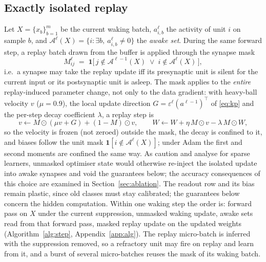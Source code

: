 \documentclass{article}
\begin{document}
\subsection{Exactly isolated replay}
\label{sec:isolation}

Let $X=\{x_b\}_{b=1}^{m}$ be the current waking batch, $a^\ell_{i,b}$ the activity of unit
$i$ on sample $b$, and $\mathcal{A}^\ell(X) = \{i : \exists b,\ a^\ell_{i,b} \neq 0\}$ the
\emph{awake set}. During the same forward step, a replay batch drawn from the buffer is
applied through the synapse mask
\begin{equation}
M^\ell_{ij} \;=\; \mathbf{1}\big[\, j \notin \mathcal{A}^{\ell-1}(X) \;\lor\; i \notin \mathcal{A}^{\ell}(X) \,\big],
\label{eq:mask}
\end{equation}
i.e.\ a synapse may take the replay update iff its presynaptic unit is silent for the current
input or its postsynaptic unit is asleep. The mask applies to the \emph{entire} replay-induced
parameter change, not only to the data gradient: with heavy-ball velocity $v$ ($\mu=0.9$),
the local update direction $G=\varepsilon^\ell(a^{\ell-1})^{\!\top}$ of \eqref{eq:kp} and the
per-step decay coefficient $\lambda$, a replay step is
\begin{equation}
v\leftarrow M\odot(\mu v+G)+(1-M)\odot v,\qquad
W\leftarrow W+\eta\,M\odot v-\lambda\,M\odot W,
\label{eq:maskedstep}
\end{equation}
so the velocity is frozen (not zeroed) outside the mask, the decay is confined to it, and
biases follow the unit mask $\mathbf{1}[i\notin\mathcal{A}^\ell(X)]$; under Adam the first and
second moments are confined the same way. As \citet{mckee2026} caution and
\citet{bricken2023} analyse for sparse learners, unmasked optimiser state would otherwise
re-inject the isolated update into awake synapses and void the guarantees below; the
accuracy consequences of this choice are examined in Section~\ref{sec:ablation}. The
readout row and its bias remain plastic, since old classes must stay calibrated; the
guarantees below concern the hidden computation. Within one waking step the order is:
forward pass on $X$ under the current suppression, unmasked waking update, awake sets read
from that forward pass, masked replay update on the updated weights
(Algorithm~\ref{alg:step}, Appendix~\ref{app:alg}). The replay micro-batch is inferred with
the suppression removed, so a refractory unit may fire on replay and learn from it, and a
burst of several micro-batches reuses the mask of its waking batch.
\end{document}

